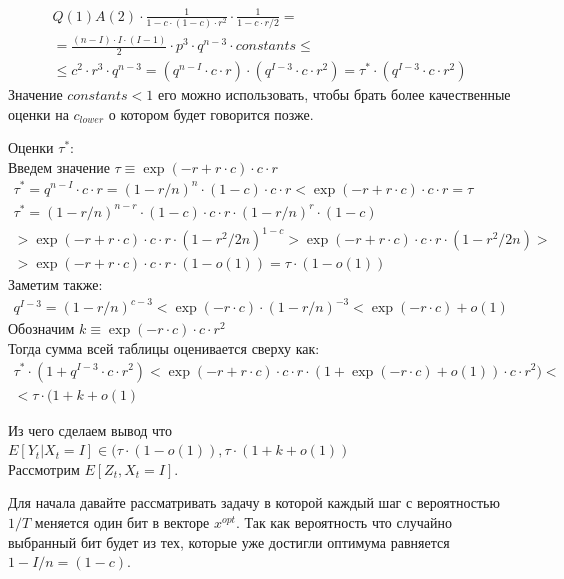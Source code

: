 \documentclass[times]{itmo-student-thesis}
\newcommand{\EY}{E[Y_t| X_t = I]}
\newcommand{\EZdelta}{$E[Z_t, X_t=I]$}
\begin{document}
    \begin{gather*}
        Q(1)A(2) \cdot \frac{1}{1 - c \cdot (1 - c) \cdot r^2 } \cdot \frac{1}{1 - c \cdot r/2} = \\
        =\frac{(n - I)\cdot I\cdot (I - 1)}{2} \cdot p^3 \cdot q^{n - 3} \cdot constants \leq\\
        \leq c^2 \cdot r^3 \cdot q^{n - 3} = (q^{n - I} \cdot c \cdot r) \cdot  (q^{I - 3} \cdot c \cdot r^2)  = \tau^* \cdot (q^{I - 3} \cdot c \cdot r^2)
    \end{gather*}
    Значение $constants < 1$ его можно использовать, чтобы брать более качественные оценки на $c_{lower}$ о котором будет говорится позже.

    Оценки $\tau^*$:  \\
    Введем значение $\tau \equiv \exp(-r + r\cdot c) \cdot c \cdot r$
    \begin{gather*}
        \tau^* = q^{n - I} \cdot c \cdot r = (1 - r/n)^n \cdot (1 - c) \cdot c \cdot r < \exp(-r + r\cdot c) \cdot c \cdot r = \tau\\
        \tau^* = (1 - r/n)^{n - r}\cdot (1 - c) \cdot c \cdot r \cdot (1 - r/n)^{r}\cdot (1 - c) \\
        > \exp(-r + r\cdot c) \cdot c \cdot r \cdot (1 - r^2/2n)^{1 - c} > \exp(-r + r\cdot c) \cdot c \cdot r \cdot (1 - r^2/2n) > \\
        > \exp(-r + r\cdot c) \cdot c \cdot r \cdot (1 - o(1)) = \tau \cdot (1 - o(1))
    \end{gather*}
    Заметим также:
    \begin{gather*}
        q^{I - 3} = (1 - r/n)^{c - 3} < \exp(-r \cdot c) \cdot (1 - r/n)^{-3} < \exp(-r\cdot c) + o(1)
    \end{gather*}
    Обозначим $k \equiv \exp(-r\cdot c) \cdot c \cdot r^2$ \\
    Тогда сумма всей таблицы оценивается сверху как:
    \begin{gather*}
        \tau^* \cdot (1 + q^{I - 3} \cdot c \cdot r^2)  < \exp(-r + r\cdot c) \cdot c \cdot r \cdot (1 + \exp(-r\cdot c) + o(1)) \cdot c \cdot r^2) < \\
        < \tau \cdot (1 + k + o(1)
    \end{gather*}

    Из чего сделаем вывод что $\EY  \in (\tau \cdot (1 - o(1)), \tau \cdot (1 + k + o(1))$ \\

    Рассмотрим \EZdelta.

    Для начала давайте рассматривать задачу в которой каждый шаг с вероятностью $1/T$ меняется один бит в векторе $x^{opt}$.
    Так как вероятность что случайно выбранный бит будет из тех, которые уже достигли оптимума равняется $1 - I/n = (1 - c)$.
\end{document}
